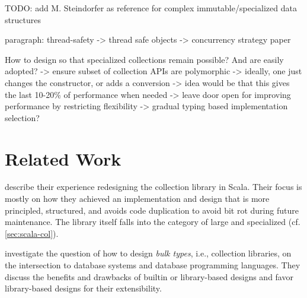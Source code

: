 \documentclass[sigconf, 10pt]{acmart}
\begin{document}
\begin{note}
  TODO: add M. Steindorfer as reference for complex immutable/specialized data structures \citep{Steindorfer:2015:OHM}


paragraph:
  thread-safety  
    -> thread safe objects
       -> concurrency strategy paper
  
  

  




How to design so that specialized collections remain possible?
And are easily adopted?
 -> ensure subset of collection APIs are polymorphic
   -> ideally, one just changes the constructor, or adds a conversion
   -> idea would be that this gives the last 10-20\% of performance when needed
   -> leave door open for improving performance by restricting flexibility
 -> gradual typing based implementation selection?
\end{note}

% 


\section{Related Work}

\citet{Odersky:2009} describe their experience
redesigning the collection library in Scala.
Their focus is mostly on how they achieved an implementation and design
that is more principled, structured, and avoids code duplication
to avoid bit rot during future maintenance.
The library itself falls into the category of large and specialized (cf. \cref{sec:scala-col}). 

\citet{Matthes:2000:BT} investigate the question of how to design \emph{bulk types}, i.e., collection libraries, on the intersection to database systems and database programming languages.
They discuss the benefits and drawbacks of builtin or library-based designs and favor library-based designs for their extensibility.
\end{document}
